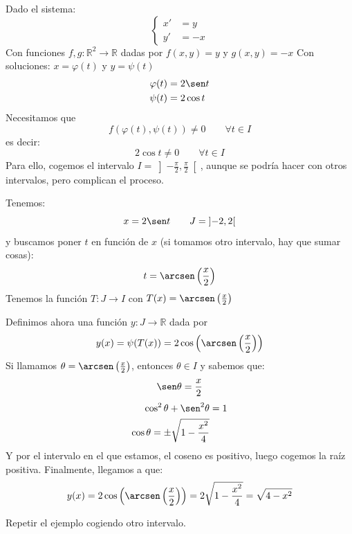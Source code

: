 \begin{ejemplo}
    Dado el sistema:
    \begin{equation*}
        \left\{\begin{array}{lr}
                x' &= y \\
                y' &= -x
        \end{array}\right.
    \end{equation*}
    Con funciones $f,g:\mathbb{R}^2\rightarrow\mathbb{R}$ dadas por $f(x,y)=y$ y $g(x,y)=-x$
    Con soluciones: $x = \varphi(t)$ y $y=\psi(t)$
    \begin{align*}
        \varphi(t) &= 2\sen t \\
        \psi(t) &= 2\cos t \\
    \end{align*}
    Necesitamos que 
    \begin{equation*}
        f(\varphi(t),\psi(t)) \neq 0 \qquad \forall t\in I
    \end{equation*}
    es decir:
    \begin{equation*}
        2\cos t \neq 0 \qquad \forall t\in I
    \end{equation*}
    Para ello, cogemos el intervalo $I = \left]-\frac{\pi}{2}, \frac{\pi}{2}\right[$, aunque se podría hacer con otros intervalos, pero complican el proceso.

    Tenemos:
    \begin{equation*}
        x=2\sen t \qquad J=\left]-2,2\right[
    \end{equation*}
    y buscamos poner $t$ en función de $x$ (si tomamos otro intervalo, hay que sumar cosas):
    \begin{equation*}
        t = \arcsen \left(\dfrac{x}{2}\right)
    \end{equation*}
    Tenemos la función $T:J\rightarrow I$ con $T(x) = \arcsen \left(\frac{x}{2}\right)$

    Definimos ahora una función $y:J\rightarrow \mathbb{R}$ dada por
    \begin{equation*}
        y(x) = \psi(T(x)) = 2\cos\left(\arcsen\left(\dfrac{x}{2}\right)\right)
    \end{equation*}
    Si llamamos $\theta = \arcsen\left(\frac{x}{2}\right)$, entonces $\theta \in I$ y sabemos que:
    \begin{equation*}
        \sen \theta = \dfrac{x}{2}
    \end{equation*}
    \begin{align*}
        \cos^2 \theta + \sen^2 \theta &= 1 \\
        \cos \theta = \pm \sqrt{1-\dfrac{x^2}{4}}
    \end{align*}
    Y por el intervalo en el que estamos, el coseno es positivo, luego cogemos la raíz positiva. Finalmente, llegamos a que:
    \begin{equation*}
        y(x) = 2\cos\left(\arcsen\left(\dfrac{x}{2}\right)\right) = 2\sqrt{1-\dfrac{x^2}{4}} = \sqrt{4-x^2}
    \end{equation*}
\end{ejemplo}

\begin{ejercicio}
    Repetir el ejemplo cogiendo otro intervalo.
\end{ejercicio}
